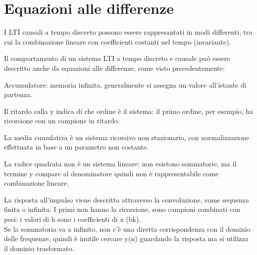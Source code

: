 \section{Equazioni alle differenze}
I LTI causali a tempo discreto possono essere rappresantati in modi differenti, tra cui la combinazione lineare con coefficienti costanti nel tempo (invariante). 

Il comportamento di un sistema LTI a tempo discreto e causale può essere descritto anche da equazioni alle differenze, come visto precedentemente:

Accumulatore: memoria infinita, generalmente si assegna un valore all'istante di partenza. 

Il ritardo sulla y indica di che ordine è il sistema: il primo ordine, per esempio, ha ricorsione con un campione in ritardo. 

La media cumulativa è un sistema ricorsivo non stazionario, con normalizzazione effettuata in base a un parametro non costante. 

La radice quadrata non è un sistema lineare: non esistono sommatorie, ma il termine y compare al denominatore quindi non è rappresentabile come combinazione lineare. 

La risposta all'impulso viene descritta attraverso la convoluzione, come sequenza finita o infinita. I primi non hanno la ricorsione, sono campioni combinati con pesi: i valori di h sono i coefficienti di x (bk). \\
Se la sommatoria va a infinito, non c'è una diretta corrispondenza con il dominio delle frequenze, quindi è inutile cercare y(n) guardando la risposta ma si utilizza il dominio trasformato.